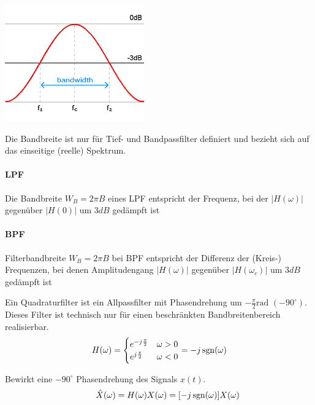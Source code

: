 \begin{minipage}{7cm}
	\includegraphics[width=6cm]{bilder/filter_bandbreite.png}
\end{minipage}
\begin{minipage}{11cm}
	Die Bandbreite ist nur für Tief- und Bandpassfilter definiert und bezieht sich auf das einseitige (reelle) Spektrum.
	\paragraph{LPF}	Die Bandbreite $W_B = 2 \pi B$ eines LPF entspricht der Frequenz, bei der $|H(\omega)|$ gegenüber $|H(0)|$ um $3 dB$ gedämpft ist
	\paragraph{BPF}	Filterbandbreite $W_B = 2 \pi B$ bei BPF entspricht der Differenz der (Kreis-) Frequenzen, bei denen Amplitudengang $|H(\omega)|$ gegenüber $|H(\omega_c)|$ um
	$3 dB$ gedämpft ist
\end{minipage}


 \label{lti_quadratur}
Ein Quadraturfilter ist ein Allpassfilter mit Phasendrehung um
$-\frac{\pi}{2}\text{rad } (-90^\circ)$. Dieses Filter ist technisch nur für einen beschränkten Bandbreitenbereich realisierbar.
\[
H(\omega) = \begin{cases}
             	e^{-j \frac{\pi}{2}} & \omega > 0 \\
             	e^{j \frac{\pi}{2}} & \omega < 0
             \end{cases} =
-j \operatorname{sgn}(\omega)
\]

 \label{lti_hilbert}
Bewirkt eine $-90^\circ$ Phasendrehung des Signals $x(t)$.
$$\qquad \hat{X}(\omega) = H(\omega)X(\omega) = [-j \operatorname{sgn}(\omega)] X(\omega)$$